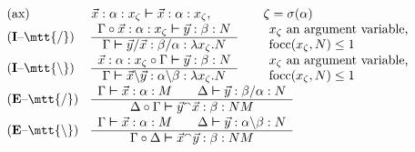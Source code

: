 \begin{table}
\caption{The Sign Based Calculus $\mathsf{L}$}%
\label{tab:lz}
$$\begin{array}{l@{\quad}l}
\mbox{(ax)} & \vec{x} : \alpha : x_{\zeta}
    \bvdash \vec{x} : \alpha : x_{\zeta}, 
\qquad\qquad
\zeta = \sigma(\alpha) 
                \\
\mbox{(\textbf{I}--{\mtt{\tf}})} & \begin{array}{c}
                \Gamma \circ \vec{x} : \alpha : x_{\zeta}
        \bvdash \vec{y} : \beta : N
        \\\hline
                \Gamma \bvdash \vec{y}/ \vec{x} : \beta/\alpha :
        \lambda x_{\zeta}. N
              \end{array} \qquad
    \begin{array}{l} 
	\mbox{$x_{\zeta}$ an argument variable,}  \\
	\focc(x_{\zeta},N) \leq 1 
	\end{array} \\
\mbox{(\textbf{I}--{\mtt{\tb}})} & \begin{array}{c}
                \vec{x} : \alpha : x_{\zeta} \circ \Gamma
        \bvdash  \vec{y} : \beta : N
        \\\hline
                \Gamma \bvdash \vec{x}\backslash \vec{y} :
        \alpha \backslash \beta :
        \lambda x_{\zeta}.N
                \end{array} \qquad
	\begin{array}{l}
              \mbox{$x_{\zeta}$ an argument variable,} \\ 
		\focc(x_{\zeta},N) \leq 1 
	\end{array} \\
\mbox{(\textbf{E}--{\mtt{\tf}})} & \begin{array}{c}
        \Gamma \bvdash \vec{x} : \alpha : M
    \qquad \Delta \bvdash \vec{y} : \beta/\alpha : N \\\hline
            \Delta \circ \Gamma \bvdash \vec{y}\conc \vec{x} : \beta :
        NM
              \end{array} \\
\mbox{(\textbf{E}--{\mtt{\tb}})} & \begin{array}{c}
        \Gamma \bvdash \vec{x} : \alpha : M \qquad
    \Delta \bvdash \vec{y} : \alpha\backslash \beta : N \\\hline
            \Gamma \circ \Delta \bvdash \vec{x} \conc \vec{y} : \beta :
        NM
                \end{array} \\

\end{array}$$
\end{table}
